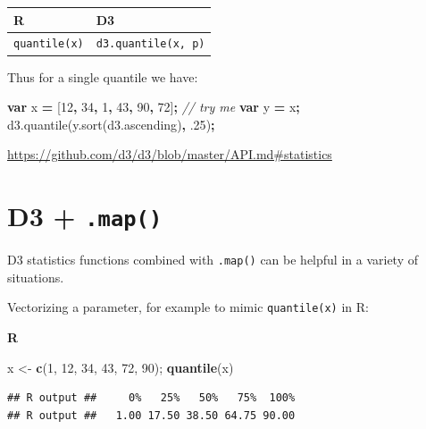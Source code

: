 \documentclass[openany]{book}
\newenvironment{Shaded}{\begin{snugshade}}{\end{snugshade}}
\newcommand{\AttributeTok}[1]{\textcolor[rgb]{0.77,0.63,0.00}{#1}}
\newcommand{\CommentTok}[1]{\textcolor[rgb]{0.56,0.35,0.01}{\textit{#1}}}
\newcommand{\DecValTok}[1]{\textcolor[rgb]{0.00,0.00,0.81}{#1}}
\newcommand{\FloatTok}[1]{\textcolor[rgb]{0.00,0.00,0.81}{#1}}
\newcommand{\KeywordTok}[1]{\textcolor[rgb]{0.13,0.29,0.53}{\textbf{#1}}}
\newcommand{\NormalTok}[1]{#1}
\newcommand{\OperatorTok}[1]{\textcolor[rgb]{0.81,0.36,0.00}{\textbf{#1}}}
\newcommand{\StringTok}[1]{\textcolor[rgb]{0.31,0.60,0.02}{#1}}
\newcommand{\VariableTok}[1]{\textcolor[rgb]{0.00,0.00,0.00}{#1}}
\begin{document}
\begin{longtable}[]{@{}ll@{}}
\toprule
R & D3\tabularnewline
\midrule
\endhead
\texttt{quantile(x)} & \texttt{d3.quantile(x,\ p)}\tabularnewline
\bottomrule
\end{longtable}

Thus for a single quantile we have:

\begin{Shaded}
\begin{Highlighting}[]
\KeywordTok{var}\NormalTok{ x }\OperatorTok{=}\NormalTok{ [}\DecValTok{12}\OperatorTok{,} \DecValTok{34}\OperatorTok{,} \DecValTok{1}\OperatorTok{,} \DecValTok{43}\OperatorTok{,} \DecValTok{90}\OperatorTok{,} \DecValTok{72}\NormalTok{]}\OperatorTok{;}      \CommentTok{// try me}
\KeywordTok{var}\NormalTok{ y }\OperatorTok{=}\NormalTok{ x}\OperatorTok{;}
\VariableTok{d3}\NormalTok{.}\AttributeTok{quantile}\NormalTok{(}\VariableTok{y}\NormalTok{.}\AttributeTok{sort}\NormalTok{(}\VariableTok{d3}\NormalTok{.}\AttributeTok{ascending}\NormalTok{)}\OperatorTok{,} \FloatTok{.25}\NormalTok{)}\OperatorTok{;}
\end{Highlighting}
\end{Shaded}

\url{https://github.com/d3/d3/blob/master/API.md\#statistics}

\hypertarget{d3-.map}{%
\section{\texorpdfstring{D3 + \texttt{.map()}}{D3 + .map()}}\label{d3-.map}}

D3 statistics functions combined with \texttt{.map()} can be helpful in a variety of situations.

Vectorizing a parameter, for example to mimic \texttt{quantile(x)} in R:

\textbf{R}

\begin{Shaded}
\begin{Highlighting}[]
\NormalTok{x <-}\StringTok{ }\KeywordTok{c}\NormalTok{(}\DecValTok{1}\NormalTok{, }\DecValTok{12}\NormalTok{, }\DecValTok{34}\NormalTok{, }\DecValTok{43}\NormalTok{, }\DecValTok{72}\NormalTok{, }\DecValTok{90}\NormalTok{);  }
\KeywordTok{quantile}\NormalTok{(x)}
\end{Highlighting}
\end{Shaded}

\begin{verbatim}
## R output ##     0%   25%   50%   75%  100% 
## R output ##   1.00 17.50 38.50 64.75 90.00
\end{verbatim}
\end{document}
